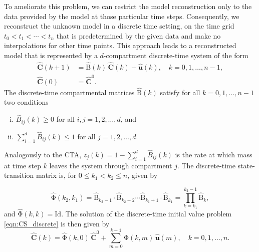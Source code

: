 \documentclass[11pt,a4paper]{article}
\renewcommand{\vec}[1]{\mathbf{#1}}
\newcommand{\tens}[1]{\mathrm{#1}}
\newcommand{\id}{\tens{Id}}
\newcommand{\suml}{\sum\limits}
\begin{document}
    To ameliorate this problem, we can restrict the model reconstruction only to the data provided by the model at those particular time steps.
    Consequently, we reconstruct the unknown model in a discrete time setting, on the time grid $t_0<t_1<\cdots<t_n$ that is predetermined by the given data and make no interpolations for  other time points.
    This approach leads to a reconstructed model that is represented by a $d$-compartment discrete-time system of the form
    \begin{equation}\label{eqn:CS_discrete}
        \begin{aligned}
            \widehat{\vec{C}}(k+1) &= \widehat{\tens{B}}(k)\,\widehat{\vec{C}}(k) + \widehat{\vec{u}}(k),\quad k=0,1,\ldots,n-1,\\
            \widehat{\vec{C}}(0) &= \widehat{\vec{C}}^0.
        \end{aligned}
    \end{equation}
    The discrete-time compartmental matrices $\widehat{\tens{B}}(k)$ satisfy for all $k=0,1,\ldots,n-1$ two conditions
    \begin{enumerate}[(i)]
        \item $\widehat{B}_{ij}(k)\geq0$ for all $i,j=1,2,\ldots,d$, and
        \item $\suml_{i=1}^d \widehat{B}_{ij}(k)\leq 1$ for all $j=1,2,\ldots,d$.
    \end{enumerate}
    Analogously to the CTA, $\widehat{z}_j(k)=1-\sum_{i=1}^d \widehat{B}_{ij}(k)$ is the rate at which mass at time step $k$ leaves the system through compartment $j$.
    The discrete-time state-transition matrix is, for $0\leq k_1<k_2\leq n$, given by
    
    \begin{equation*}
        \widehat{\tens{\Phi}}(k_2,k_1) = \widehat{\tens{B}}_{k_2-1}\cdot\widehat{\tens{B}}_{k_2-2}\cdots\widehat{\tens{B}}_{k_1+1}\cdot\widehat{\tens{B}}_{k_1} = \prod\limits_{k=k_1}^{k_2-1}\widehat{\tens{B}}_k,
    \end{equation*}
    and $\widehat{\tens{\Phi}}(k,k)=\id$.
    The solution of the discrete-time initial value problem \eqref{eqn:CS_discrete} is then given by
    \begin{equation*}
        \widehat{\vec{C}}(k) = \widehat{\tens{\Phi}}(k,0)\,\widehat{\vec{C}}^0 + \suml_{m=0}^{k-1} \widehat{\tens{\Phi}}(k,m)\,\widehat{\vec{u}}(m),\quad k=0,1,\ldots,n.
    \end{equation*}
    
\end{document}
